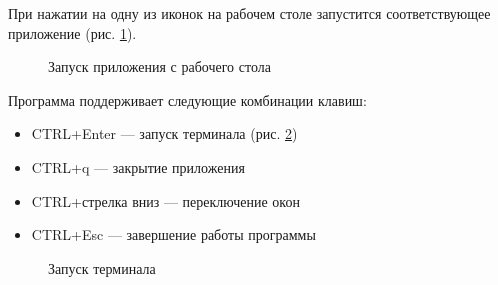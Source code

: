 \documentclass[10pt,a4paper]{report}
\begin{document}
При нажатии на одну из иконок на рабочем столе запустится соответствующее приложение (рис. \ref{fig:wm5}).
\begin{figure}[h!]
\caption{Запуск приложения с рабочего стола}
\label{fig:wm5}
\end{figure}

Программа поддерживает следующие комбинации клавиш:
\begin{itemize}
\item CTRL+Enter --- запуск терминала (рис. \ref{fig:wm2})
\item CTRL+q --- закрытие приложения
\item CTRL+стрелка вниз --- переключение окон
\item CTRL+Esc --- завершение работы программы
\end{itemize}
\begin{figure}[h!]
\caption{Запуск терминала}
\label{fig:wm2}
\end{figure}
\end{document}

